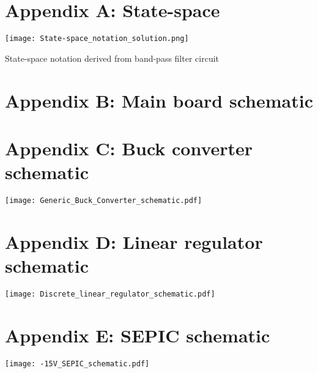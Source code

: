 \section*{Appendix A: State-space}


    \texttt{[image: State-space\_notation\_solution.png]}
    \caption{State-space notation derived from band-pass filter circuit}
\newpage
\newpage

\section*{Appendix B: Main board schematic}


\section*{Appendix C: Buck converter schematic}
\texttt{[image: Generic\_Buck\_Converter\_schematic.pdf]}

\section*{Appendix D: Linear regulator schematic}
\texttt{[image: Discrete\_linear\_regulator\_schematic.pdf]}

\section*{Appendix E: SEPIC schematic}
\texttt{[image: -15V\_SEPIC\_schematic.pdf]}